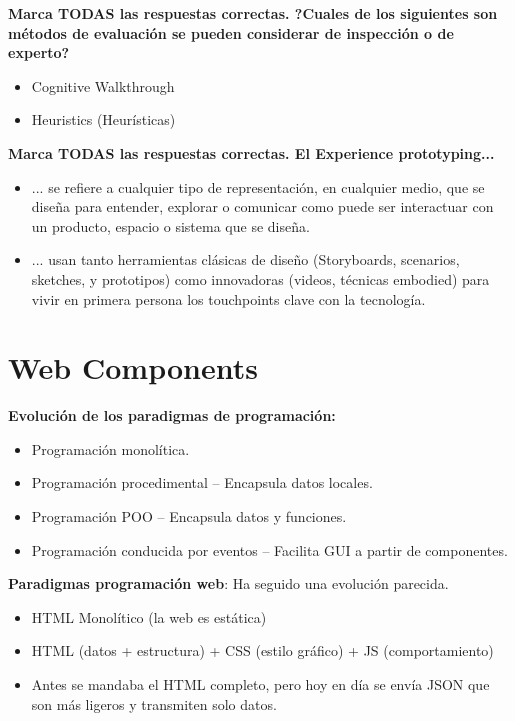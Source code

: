 \documentclass[12pt]{report} %
\begin{document}
\textbf{Marca TODAS las respuestas correctas. ?Cuales de los siguientes son métodos de evaluación se pueden considerar de inspección o de experto?}
\begin{itemize}
  \item Cognitive Walkthrough
  \item Heuristics (Heurísticas)
\end{itemize}

\textbf{Marca TODAS las respuestas correctas. El Experience prototyping...}
\begin{itemize}
  \item ... se refiere a cualquier tipo de representación, en cualquier medio, que se diseña para entender, explorar o comunicar como puede ser interactuar con un producto, espacio o sistema que se diseña.
  \item ... usan tanto herramientas clásicas de diseño (Storyboards, scenarios, sketches, y prototipos) como innovadoras (videos, técnicas embodied) para vivir en primera persona los touchpoints clave con la tecnología.
\end{itemize}


\chapter{Web Components}

\textbf{Evolución de los paradigmas de programación:}

\begin{itemize}
  \item Programación monolítica.
  \item Programación procedimental -- Encapsula datos locales.
  \item Programación POO -- Encapsula datos y funciones.
  \item Programación conducida por eventos -- Facilita GUI a partir de componentes.
\end{itemize}

\textbf{Paradigmas programación web}: Ha seguido una evolución parecida.

\begin{itemize}
\item HTML Monolítico (la web es estática)
\item HTML (datos + estructura) + CSS (estilo gráfico) + JS (comportamiento)
\item Antes se mandaba el HTML completo, pero hoy en día se envía JSON que son más ligeros y transmiten solo datos.
\end{itemize}
\end{document}
